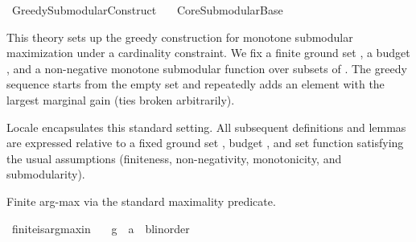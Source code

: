 %
\begin{isabellebody}%
%
%
\isadelimtheory
%
\endisadelimtheory
%
\isatagtheory
{}\isamarkupfalse%
\ Greedy{\isacharunderscore}{\kern0pt}Submodular{\isacharunderscore}{\kern0pt}Construct\isanewline
\ \ \ {\isachardoublequoteopen}{\isachardot}{\kern0pt}{\isachardot}{\kern0pt}{\isacharslash}{\kern0pt}Core{\isacharslash}{\kern0pt}Submodular{\isacharunderscore}{\kern0pt}Base{\isachardoublequoteclose}\isanewline
{}%
\endisatagtheory
{\isafoldtheory}%
%
\isadelimtheory
%
\endisadelimtheory
%
\isadelimdocument
%
\endisadelimdocument
%
\isatagdocument
%
\isamarkuptrue%
%
\endisatagdocument
{\isafolddocument}%
%
\isadelimdocument
%
\endisadelimdocument
%
\begin{isamarkuptext}%
This theory sets up the greedy construction for monotone submodular
  maximization under a cardinality constraint. We fix a finite ground set
  , a budget , and a non-negative monotone submodular function
   over subsets of . The greedy sequence starts from the empty set
  and repeatedly adds an element with the largest marginal gain
  (ties broken arbitrarily).%
\end{isamarkuptext}\isamarkuptrue%
%
\begin{isamarkuptext}%
Locale  encapsulates this standard setting. All subsequent
  definitions and lemmas are expressed relative to a fixed ground set ,
  budget , and set function  satisfying the usual assumptions
  (finiteness, non-negativity, monotonicity, and submodularity).%
\end{isamarkuptext}\isamarkuptrue%
%
\isadelimdocument
%
\endisadelimdocument
%
\isatagdocument
%
\isamarkuptrue%
%
\endisatagdocument
{\isafolddocument}%
%
\isadelimdocument
%
\endisadelimdocument
%
\begin{isamarkuptext}%
Finite arg-max via the standard maximality predicate.%
\end{isamarkuptext}\isamarkuptrue%
\isamarkupfalse%
\ finite{\isacharunderscore}{\kern0pt}is{\isacharunderscore}{\kern0pt}arg{\isacharunderscore}{\kern0pt}max{\isacharunderscore}{\kern0pt}in{\isacharcolon}{\kern0pt}\isanewline
\ \ \ g\ {\isacharcolon}{\kern0pt}{\isacharcolon}{\kern0pt}\ {\isachardoublequoteopen}{\isacharprime}{\kern0pt}a\ {\isasymRightarrow}\ {\isacharprime}{\kern0pt}b{\isacharcolon}{\kern0pt}{\isacharcolon}{\kern0pt}linorder{\isachardoublequoteclose}\isanewline

\end{isabellebody}
